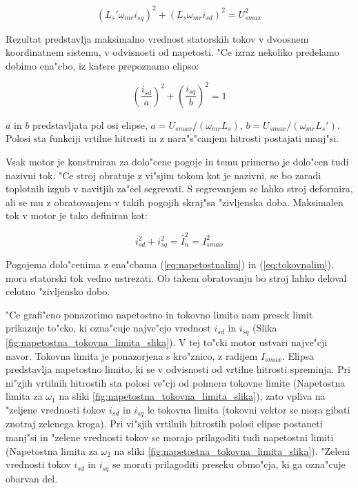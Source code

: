 \documentclass[journal,a4paper,twoside]{sty/IEEEtran}
\begin{document}
\begin{equation}
(L_s' \omega_{mr} i_{sq})^2+(L_s \omega_{mr}i_{sd})^2= U_{smax}^2
\label{eq:napetostnalim1}
\end{equation}

Rezultat predstavlja maksimalno vrednost statorskih tokov v dvoosnem koordinatnem sistemu, v odvisnosti od napetosti. "Ce izraz nekoliko predelamo dobimo ena"cbo, iz katere prepoznamo elipso: 

\begin{equation}
(\frac{i_{sd}}{a})^2+(\frac{i_{sq}}{b})^2 = 1
\label{eq:napetostnalim}
\end{equation}

$a$ in $b$ predstavljata pol osi elipse, $a=U_{smax}/(\omega_{mr}L_s)$, $b=U_{smax}/(\omega_{mr}L_s')$. Polosi sta funkciji vrtilne hitrosti in z nara"s"canjem hitrosti postajati manj"si.

Vsak motor je konstruiran za dolo"cene pogoje in temu primerno je dolo"cen tudi nazivni tok. "Ce stroj obratuje z vi"sjim tokom kot je nazivni, se bo zaradi toplotnih izgub v navitjih za"cel segrevati. S segrevanjem se lahko stroj deformira, ali se mu z obratovanjem v takih pogojih skraj"sa "zivljenska doba. Maksimalen tok v motor je tako definiran kot:

\begin{equation}
i_{sd}^2+i_{sq}^2=\hat{I}_{n}^2=I_{smax}^2
\label{eq:tokovnalim}
\end{equation}

Pogojema dolo"cenima z ena"cbama (\ref{eq:napetostnalim}) in (\ref{eq:tokovnalim}), mora statorski tok vedno ustrezati. Ob takem obratovanju bo stroj lahko deloval celotno "zivljensko dobo.\cite{vas}

"Ce grafi"cno ponazorimo napetostno in tokovno limito nam presek limit prikazuje to"cko, ki ozna"cuje najve"cjo vrednost $i_{sd}$ in $i_{sq}$ (Slika \ref{fig:napetostna_tokovna_limita_slika}). V tej to"cki motor ustvari najve"cji navor. Tokovna limita je ponazorjena s kro"znico, z radijem $I_{smax}$. Elipsa predstavlja napetostno limito, ki se v odvisnosti od vrtilne hitrosti spreminja. Pri ni"zjih vrtilnih hitrostih sta polosi ve"cji od polmera tokovne limite (Napetostna limita za $\omega_1$ na sliki \ref{fig:napetostna_tokovna_limita_slika}), zato vpliva na "zeljene vrednosti tokov $i_{sd}$ in $i_{sq}$ le tokovna limita (tokovni vektor se mora gibati znotraj zelenega kroga). Pri vi"sjih vrtilnih hitrostih polosi elipse postaneti manj"si in "zelene vrednosti tokov se morajo prilagoditi tudi napetostni limiti (Napetostna limita za $\omega_2$ na sliki \ref{fig:napetostna_tokovna_limita_slika}). "Zeleni vrednosti tokov $i_{sd}$ in $i_{sq}$ se morati prilagoditi preseku obmo"cja, ki ga ozna"cuje obarvan del.
\end{document}
